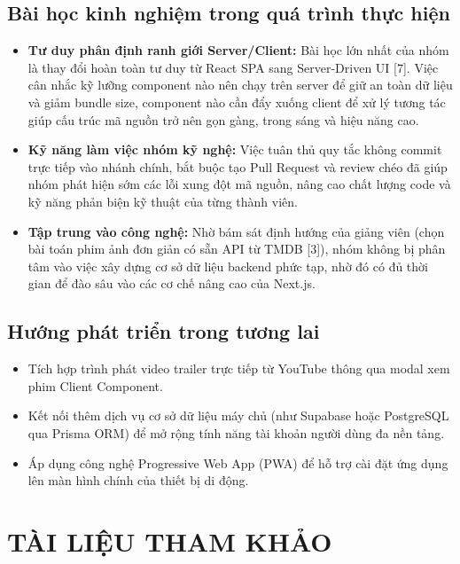 \documentclass[13pt,a4paper]{extarticle}
\begin{document}
\subsection{Bài học kinh nghiệm trong quá trình thực hiện}
\begin{itemize}[noitemsep]
    \item \textbf{Tư duy phân định ranh giới Server/Client:} Bài học lớn nhất của nhóm là thay đổi hoàn toàn tư duy từ React SPA sang Server-Driven UI [7]. Việc cân nhắc kỹ lưỡng component nào nên chạy trên server để giữ an toàn dữ liệu và giảm bundle size, component nào cần đẩy xuống client để xử lý tương tác giúp cấu trúc mã nguồn trở nên gọn gàng, trong sáng và hiệu năng cao.
    \item \textbf{Kỹ năng làm việc nhóm kỹ nghệ:} Việc tuân thủ quy tắc không commit trực tiếp vào nhánh chính, bắt buộc tạo Pull Request và review chéo đã giúp nhóm phát hiện sớm các lỗi xung đột mã nguồn, nâng cao chất lượng code và kỹ năng phản biện kỹ thuật của từng thành viên.
    \item \textbf{Tập trung vào công nghệ:} Nhờ bám sát định hướng của giảng viên (chọn bài toán phim ảnh đơn giản có sẵn API từ TMDB [3]), nhóm không bị phân tâm vào việc xây dựng cơ sở dữ liệu backend phức tạp, nhờ đó có đủ thời gian để đào sâu vào các cơ chế nâng cao của Next.js.
\end{itemize}

\subsection{Hướng phát triển trong tương lai}
\begin{itemize}[noitemsep]
    \item Tích hợp trình phát video trailer trực tiếp từ YouTube thông qua modal xem phim Client Component.
    \item Kết nối thêm dịch vụ cơ sở dữ liệu máy chủ (như Supabase hoặc PostgreSQL qua Prisma ORM) để mở rộng tính năng tài khoản người dùng đa nền tảng.
    \item Áp dụng công nghệ Progressive Web App (PWA) để hỗ trợ cài đặt ứng dụng lên màn hình chính của thiết bị di động.
\end{itemize}

\newpage
\section*{TÀI LIỆU THAM KHẢO}
\end{document}
